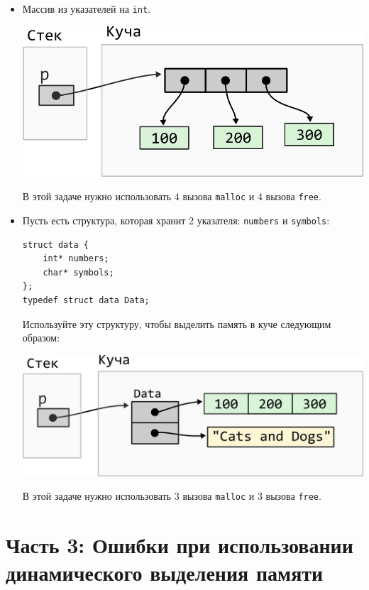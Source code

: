 \documentclass{article}
\begin{document}
\begin{itemize}
\item Массив из указателей на \texttt{int}.
\begin{center}
\includegraphics[scale=0.83]{../images/malloc_class_tasks/heap_pointer_array.png}
\end{center}
В этой задаче нужно использовать 4 вызова \texttt{malloc} и 4 вызова \texttt{free}.

\item Пусть есть структура, которая хранит 2 указателя: \texttt{numbers} и \texttt{symbols}:
\begin{lstlisting}
struct data {
    int* numbers;
    char* symbols;
};
typedef struct data Data;
\end{lstlisting}

Используйте эту структуру, чтобы выделить память в куче следующим образом:
\begin{center}
\includegraphics[scale=0.83]{../images/malloc_class_tasks/heap_struct_with_pointers.png}
\end{center}
В этой задаче нужно использовать 3 вызова \texttt{malloc} и 3 вызова \texttt{free}.
\end{itemize}


\newpage
\section*{Часть 3: Ошибки при использовании динамического выделения памяти}
\end{document}
